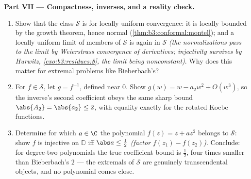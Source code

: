 \begin{problem}
\begin{enumerate}[resume]
\end{enumerate}
\medskip
\noindent\textbf{Part VII --- Compactness, inverses, and a
reality check.}
\begin{enumerate}[resume]
  \item Show that the class $\mathcal S$ is \emph{}
        for locally uniform convergence: it is locally
        bounded by the growth theorem, hence normal
        (\cref{thm:b3:conformal:montel}); and a locally
        uniform limit of members of $\mathcal S$ is again in
        $\mathcal S$ \emph{(the normalizations pass to the
        limit by Weierstrass convergence of derivatives;
        injectivity survives by Hurwitz,
        \cref{exo:b3:residues:8}, the limit being
        nonconstant)}. Why does this matter for extremal
        problems like Bieberbach's?
  \item For $f \in \mathcal S$, let $g = f^{-1}$, defined
        near $0$. Show $g(w) = w - a_2w^2 + O(w^3)$, so the
        inverse's second coefficient obeys the same sharp
        bound $\abs{A_2} = \abs{a_2} \leq 2$, with equality
        exactly for the rotated Koebe functions.
  \item Determine for which $a \in \C$ the polynomial $f(z)
        = z + az^2$ belongs to $\mathcal S$: show $f$ is
        injective on $\mathbb D$ iff $\abs a \leq \frac12$
        \emph{(factor $f(z_1) - f(z_2)$)}. Conclude: for
        degree-two polynomials the true coefficient bound is
        $\frac12$, four times smaller than Bieberbach's $2$
        --- the extremals of $\mathcal S$ are genuinely
        transcendental objects, and no polynomial comes
        close.
\end{enumerate}
\end{problem}
